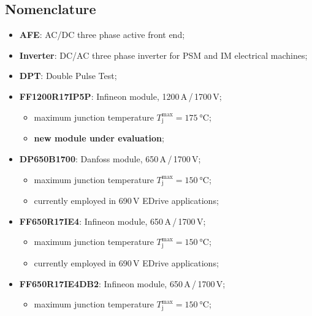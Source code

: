\documentclass[11pt,a4paper]{scrartcl}
\title{\textbf{
		\begin{LARGE}
			DPTs for 690\,V EDrive IGBT Module:
		\end{LARGE} \\[12pt]
		\begin{Large}
			Evaluation with different driver concepts.
		\end{Large}
}}
\author{\textbf{Davide Bagnara}}
\begin{document}
	\thispagestyle{firstpage}
	\begin{mybox}
		\maketitle
		\vspace{100mm}
	\end{mybox}
	\newpage
	\tableofcontents
	\listoffigures
	\listoftables
	
	
	\newpage
	\subsection*{Nomenclature}
	\begin{itemize}
		\item[--] \textbf{AFE}: AC/DC three phase active front end;
		\item[--] \textbf{Inverter}: DC/AC three phase inverter for PSM and IM electrical machines;
		\item[--] \textbf{DPT}: Double Pulse Test;
		\item[--] \textbf{FF1200R17IP5P}: Infineon module, 1200\,A\,/\,1700\,V;
		\begin{itemize}
			\item[--] maximum junction temperature $T_\text{j}^\text{max} = \SI{175}{\celsius}$;
			\item[--] \textbf{new module under evaluation};
		\end{itemize}
		\item[--] \textbf{DP650B1700}: Danfoss module, 650\,A\,/\,1700\,V;
		\begin{itemize}
			\item[--] maximum junction temperature $T_\text{j}^\text{max} = \SI{150}{\celsius}$;
			\item[--] currently employed in 690\,V EDrive applications;
		\end{itemize}
		\item[--] \textbf{FF650R17IE4}: Infineon module, 650\,A\,/\,1700\,V;
		\begin{itemize}
			\item[--] maximum junction temperature $T_\text{j}^\text{max} = \SI{150}{\celsius}$;
			\item[--] currently employed in 690\,V EDrive applications;
		\end{itemize}
		\item[--] \textbf{FF650R17IE4DB2}: Infineon module, 650\,A\,/\,1700\,V;
		\begin{itemize}
			\item[--] maximum junction temperature $T_\text{j}^\text{max} = \SI{150}{\celsius}$;

\end{itemize}
\end{itemize}
\end{document}
